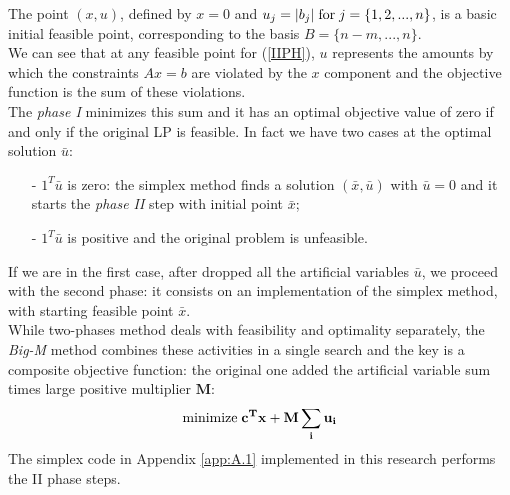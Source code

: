 \documentclass[a4paper,10 pt,titlepage,twoside]{book}
\theoremstyle{plain}
\theoremstyle{definition}
\theoremstyle{remark}
\begin{document}
The point $(x,u)$, defined by $x = 0$ and $u_{j} = |b_{j}| \text{\;for\;}j =\{1,2,...,n\}$, is a basic initial feasible point, corresponding to the basis $B = \{n-m,...,n\}$.\\ We can see that at any feasible point for (\ref{IIPH}), $u$ represents the amounts by which the constraints $Ax = b$ are violated by the $x$ component and the objective function is the sum of these violations. \\
The \textit{phase I} minimizes this sum and it has an optimal objective value of zero if and only if the original LP is feasible. In fact we have two cases at the optimal solution $\bar{u}$: 
\begin{itemize}
	\item[-]$1^{T}\bar{u}$ is zero: the simplex method finds a solution $(\bar{x},\bar{u})$ with $\bar{u}=0$ and it starts the \textit{phase II} step with initial point $\bar{x}$;
	\item[-]$1^{T}\bar{u}$ is positive and the original problem is unfeasible.
\end{itemize}
If we are in the first case, after dropped all the artificial variables $\bar{u}$, we proceed with the second phase: it consists on an implementation of the simplex method, with starting feasible point $\bar{x}$.\\ 
While two-phases method deals with feasibility and optimality separately, the \textit{Big-M} method combines these activities in a single search and the key is a composite objective function: the original one added the artificial variable sum times  large positive multiplier $\mathbf{M}$:\\
\begin{equation}
\text{minimize\;}\mathbf{c^{T}x+M \sum_{i}{u}_{i}}\\
\end{equation}
The simplex code in Appendix \ref{app:A.1} implemented in this research performs the II phase steps.
\end{document}
